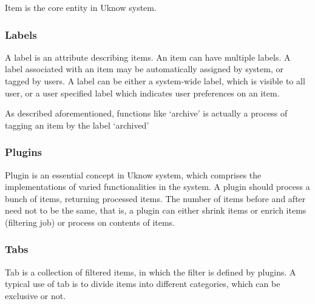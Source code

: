       Item is the core entity in Uknow system.

    \subsubsection{Labels}

      A label is an attribute describing items. An item can have multiple
      labels. A label associated with an item may be automatically assigned by
      system, or tagged by users. A label can be either a system-wide label,
      which is visible to all user, or a user specified label which indicates
      user preferences on an item.

      As described aforementioned, functions like `archive' is actually a process of tagging an
      item by the label `archived'

    \subsubsection{Plugins}

      Plugin is an essential concept in Uknow system, which comprises the
      implementations of varied functionalities in the system. A plugin should
      process a bunch of items, returning processed items. The number of items
      before and after need not to be the same, that is, a plugin can either
      shrink items or enrich items (filtering job) or process on contents of
      items.

    \subsubsection{Tabs}

      Tab is a collection of filtered items, in which the filter is defined by
      plugins. A typical use of tab is to divide items into different
      categories, which can be exclusive or not.


